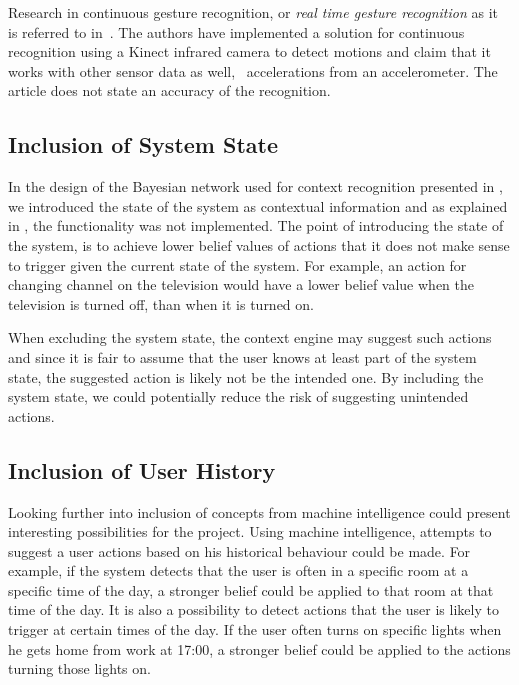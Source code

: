 Research in continuous gesture recognition, or \emph{real time gesture recognition} as it is referred to in~\cite{gillian2014gesture}. The authors have implemented a solution for continuous recognition using a Kinect infrared camera to detect motions and claim that it works with other sensor data as well, \eg~accelerations from an accelerometer. The article does not state an accuracy of the recognition.

\subsection{Inclusion of System State}

In the design of the Bayesian network used for context recognition presented in , we introduced the state of the system as contextual information and as explained in , the functionality was not implemented. The point of introducing the state of the system, is to achieve lower belief values of actions that it does not make sense to trigger given the current state of the system. For example, an action for changing channel on the television would have a lower belief value when the television is turned off, than when it is turned on. 

When excluding the system state, the context engine may suggest such actions and since it is fair to assume that the user knows at least part of the system state, the suggested action is likely not be the intended one. By including the system state, we could potentially reduce the risk of suggesting unintended actions.

\subsection{Inclusion of User History}

Looking further into inclusion of concepts from machine intelligence could present interesting possibilities for the project. Using machine intelligence, attempts to suggest a user actions based on his historical behaviour could be made. For example, if the system detects that the user is often in a specific room at a specific time of the day, a stronger belief could be applied to that room at that time of the day. It is also a possibility to detect actions that the user is likely to trigger at certain times of the day. If the user often turns on specific lights when he gets home from work at 17:00, a stronger belief could be applied to the actions turning those lights on.

